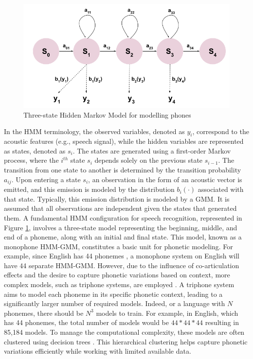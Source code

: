 \begin{figure}
    \begin{center}
    \includegraphics[scale=0.3]{imgs/HMM_monophone.png}
    \caption{Three-state Hidden Markov Model for modelling phones}
    \label{HMM_monophone}    
    \end{center}
\end{figure}
In the \ac{HMM} terminology, the observed variables, denoted as $y_i$, correspond to the acoustic features (e.g., speech signal), while the hidden variables are represented as states, denoted as $s_i$. The states are generated using a first-order Markov process, where the $i^{th}$ state $s_i$ depends solely on the previous state $s_{i-1}$. The transition from one state to another is determined by the transition probability $a_{ij}$. Upon entering a state $s_i$, an observation in the form of an acoustic vector is emitted, and this emission is modeled by the distribution $b_i(\cdot)$ associated with that state. Typically, this emission distribution is modeled by a \ac{GMM}. It is assumed that all observations are independent given the states that generated them. A fundamental \ac{HMM} configuration for speech recognition, represented in Figure \ref{HMM_monophone}, involves a three-state model representing the beginning, middle, and end of a phoneme, along with an initial and final state. This model, known as a monophone \ac{HMM-GMM}, constitutes a basic unit for phonetic modeling. For example, since English has 44 phonemes \cite{bizzocchi2017many}, a monophone system on English will have 44 separate \ac{HMM-GMM}. However, due to the influence of co-articulation effects and the desire to capture phonetic variations based on context, more complex models, such as triphone systems, are employed \cite{schwartz1985context}. A triphone system aims to model each phoneme in its specific phonetic context, leading to a significantly larger number of required models.  Indeed, or a language with $N$ phonemes, there should be $N^3$ models to train. For example, in English, which has 44 phonemes, the total number of models would be  $44 * 44 * 44$ resulting in 85,184 models. To manage the computational complexity, these models are often clustered using decision trees \cite{bahl1991context}. This hierarchical clustering helps capture phonetic variations efficiently while working with limited available data.

